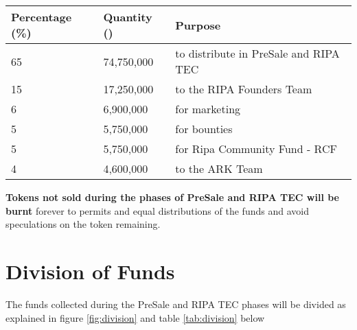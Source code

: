 \documentclass[11pt,fleqn,oneside]{book} %
\begin{document}
\vspace{5mm}
	\label{fig:distribution}

\vspace{5mm}
\begin{table}[H]
	\centering
	\begin{tabular}{l l l}
		\toprule
		\textbf{Percentage (\%)} & \textbf{Quantity (\PHP)} & \textbf{Purpose} \\
		\midrule
		65		& 74,750,000	& to distribute in PreSale and RIPA TEC	\\
		15      & 17,250,000	& to the RIPA Founders Team	\\
		6       & 6,900,000		& for marketing	\\
		5       & 5,750,000 	& for bounties	\\
		5       & 5,750,000		& for Ripa Community Fund - RCF	\\
		4       & 4,600,000		& to the ARK Team	\\
		\bottomrule
	\end{tabular}
	\label{tab:distribution}
\end{table}

\vspace{5mm}
\textbf{Tokens not sold during the phases of PreSale and RIPA TEC will be burnt} forever to permits and equal distributions 
of the funds and avoid speculations on the token remaining.

\section{Division of Funds}
The funds collected during the PreSale and RIPA TEC phases will be divided as explained in figure \ref{fig:division} and 
table \ref{tab:division} below

\vspace{5mm}
\label{fig:division}
\end{document}
